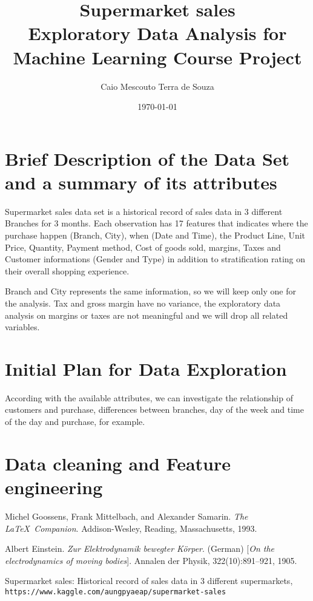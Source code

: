 \documentclass[11pt, a4]{article}
\title{Supermarket sales \\
		\large Exploratory Data Analysis for Machine Learning Course Project}
\author{Caio Mescouto Terra de Souza}
\date{\today}
\begin{document}
\maketitle

\section*{Brief Description of the Data Set and a summary of its attributes}

Supermarket sales data set \cite{sales} is a historical record of sales data in 3 different Branches for 3 months. Each observation has 17 features that indicates where the purchase happen (Branch, City), when (Date and Time), the Product Line, Unit Price, Quantity, Payment method, Cost of goods sold, margins, Taxes and Customer informations (Gender and Type) in addition to stratification rating on their overall shopping experience.

Branch and City represents the same information, so we will keep only one for the analysis.
Tax and gross margin have no variance, the exploratory data analysis on margins or taxes are not meaningful and we will drop all related variables.



\section*{Initial Plan for Data Exploration}

According with the available attributes, we can investigate the relationship of customers and purchase, differences between branches, day of the week and time of the day and purchase, for example.

\section*{Data cleaning and Feature engineering} 

\begin{thebibliography}{9}
Michel Goossens, Frank Mittelbach, and Alexander Samarin. 
\textit{The \LaTeX\ Companion}. 
Addison-Wesley, Reading, Massachusetts, 1993.

Albert Einstein. 
\textit{Zur Elektrodynamik bewegter K{\"o}rper}. (German) 
[\textit{On the electrodynamics of moving bodies}]. 
Annalen der Physik, 322(10):891–921, 1905.

Supermarket sales:
Historical record of sales data in 3 different supermarkets,
\\\texttt{https://www.kaggle.com/aungpyaeap/supermarket-sales}
\end{thebibliography}
\end{document}
